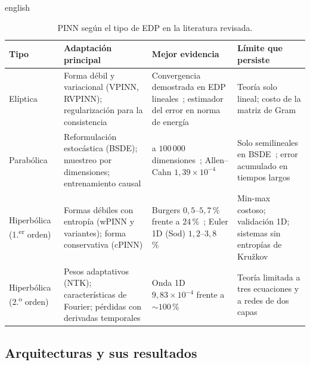 \documentclass[0000.tex]{subfiles}
\begin{document}
\begin{hyphenrules}{english}
\begin{table}[htbp]
\centering\small
\caption{PINN según el tipo de EDP en la literatura revisada.}
\label{tab:ea-tipos}
\begin{tabularx}{\textwidth}{@{}l >{\raggedright\arraybackslash}X >{\raggedright\arraybackslash}X >{\raggedright\arraybackslash}X@{}}
\toprule
Tipo & Adaptación principal & Mejor evidencia & Límite que persiste \\
\midrule
Elíptica & Forma débil y variacional (VPINN, RVPINN); regularización para la consistencia & Convergencia demostrada en EDP lineales~\cite{shin2020convergence,doumeche2025convergence}; estimador del error en norma de energía~\cite{rojas2024robust} & Teoría solo lineal; costo de la matriz de Gram~\cite{rojas2024robust} \\
Parabólica & Reformulación estocástica (BSDE); muestreo por dimensiones; entrenamiento causal & 100 a $100\,000$ dimensiones~\cite{han2018solving,hu2024tackling}; Allen--Cahn $1{,}39\times10^{-4}$~\cite{wang2022respecting} & Solo semilineales en BSDE~\cite{han2018solving}; error acumulado en tiempos largos~\cite{wang2022respecting} \\
Hiperbólica (1.\textsuperscript{er} orden) & Formas débiles con entropía (wPINN y variantes); forma conservativa (cPINN) & Burgers $0{,}5$--$5{,}7$\,\% frente a $24$\,\%~\cite{de2024wpinns}; Euler 1D (Sod) $1{,}2$--$3{,}8$\,\%~\cite{chaumet2024improving} & Min-max costoso; validación 1D; sistemas sin entropías de Kružkov~\cite{de2024wpinns,chaumet2024improving} \\
Hiperbólica (2.\textsuperscript{o} orden) & Pesos adaptativos (NTK); características de Fourier; pérdidas con derivadas temporales & Onda 1D $9{,}83\times10^{-4}$ frente a ${\sim}100$\,\%~\cite{wang2021eigenvector} & Teoría limitada a tres ecuaciones y a redes de dos capas~\cite{qian2023error} \\
\bottomrule
\end{tabularx}
\end{table}

\subsection{Arquitecturas y sus resultados}
\label{subsec:ea-arq}


\end{hyphenrules}
\end{document}

